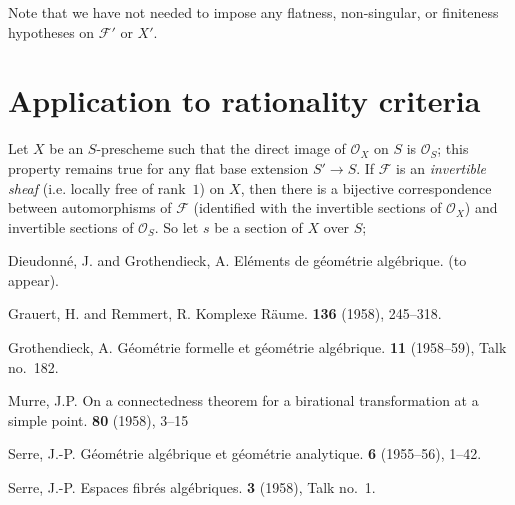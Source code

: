 \documentclass{article}
\theoremstyle{plain}
\theoremstyle{definition}
\newcommand{\sh}[1]{{\mathscr{#1}}}
\begin{document}
Note that we have not needed to impose any flatness, non-singular, or finiteness hypotheses on $\sh{F}'$ or $X'$.


\section{Application to rationality criteria}
\label{B.4}

Let $X$ be an $S$-prescheme such that the direct image of $\sh{O}_X$ on $S$ is $\sh{O}_S$;
this property remains true for any flat base extension $S'\to S$.
If $\sh{F}$ is an \emph{invertible sheaf} (i.e. locally free of rank~$1$) on $X$, then there is a bijective correspondence between automorphisms of $\sh{F}$ (identified with the invertible sections of $\sh{O}_X$) and invertible sections of $\sh{O}_S$.
So let $s$ be a section of $X$ over $S$;





\nocite{*}
\begin{thebibliography}{6}

  {\sc Dieudonn\'{e}, J. and Grothendieck, A.}
  \newblock El\'{e}ments de g\'{e}om\'{e}trie alg\'{e}brique.
   (to appear).

  {\sc Grauert, H. and Remmert, R.}
  \newblock Komplexe R\"{a}ume.
   \textbf{136} (1958), 245--318.

  {\sc Grothendieck, A.}
  \newblock G\'{e}om\'{e}trie formelle et g\'{e}om\'{e}trie alg\'{e}brique.
   \textbf{11} (1958--59), Talk no.~182.

  {\sc Murre, J.P.}
  \newblock On a connectedness theorem for a birational transformation at a simple point.
   \textbf{80} (1958), 3--15

  {\sc Serre, J.-P.}
  \newblock G\'{e}om\'{e}trie alg\'{e}brique et g\'{e}om\'{e}trie analytique.
   \textbf{6} (1955--56), 1--42.

  {\sc Serre, J.-P.}
  \newblock Espaces fibr\'{e}s alg\'{e}briques.
   \textbf{3} (1958), Talk no.~1.

\end{thebibliography}
\end{document}
